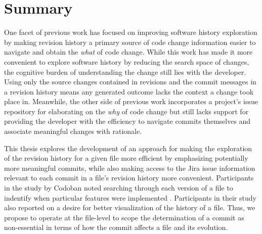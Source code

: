
\section{Summary}

One facet of previous work has focused on improving software history exploration by making revision history 
a primary source of code change information easier to navigate and obtain the \emph{what} of code change.
While this work has made it more convenient to explore software history by reducing the search space of changes, 
the cognitive burden of understanding the change still lies with the developer.
Using only the source changes contained in revisions and the commit messages in a revision history 
means any generated outcome lacks the context a change took place in.
Meanwhile, the other side of previous work incorporates a project's issue repository for elaborating 
on the \emph{why} of code change but still lacks support for providing the developer with the efficiency to 
navigate commits themselves and associate meaningful changes with rationale.

This thesis explores the development of an approach for making the exploration of the revision history 
for a given file more efficient by emphasizing potentially more meaningful commits, while also making 
access to the Jira issue information relevant to each commit in a file's revision history more convenient.
Participants in the study by Codoban \etal noted searching through
each version of a file to indentify when particular features were
implemented \cite{codoban_software_2015}. 
Participants in their study also reported on a desire for 
better visualization of the history of a file.
Thus, we propose to operate at the file-level to scope the determination of
a commit as non-essential in terms of how the commit affects a file and
its evolution.

\endinput

Any text after an \endinput is ignored.
You could put scraps here or things in progress.